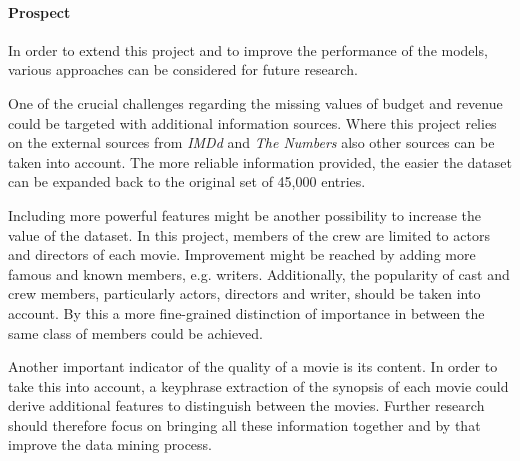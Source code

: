 \paragraph{Prospect}
\label{cha:prospect}
In order to extend this project and to improve the performance of the models, various approaches can be considered for future research. 

One of the crucial challenges regarding the missing values of budget and revenue could be targeted with additional information sources. Where this project relies on the external sources from \textit{IMDd} and \textit{The Numbers} also other sources can be taken into account. The more reliable information provided, the easier the dataset can be expanded back to the original set of 45,000 entries.

\normalsize Including more powerful features might be another possibility to increase the value of the dataset. In this project, members of the crew are limited to actors and directors of each movie. Improvement might be reached by adding more famous and known members, e.g. writers. Additionally, the popularity of cast and crew members, particularly actors, directors and writer, should be taken into account. By this a more fine-grained distinction of importance in between the same class of members could be achieved.

Another important indicator of the quality of a movie is its content. In order to take this into account, a keyphrase extraction of the synopsis of each movie could derive additional features to distinguish between the movies. Further research should therefore focus on bringing all these information together and by that improve the data mining process.

%
